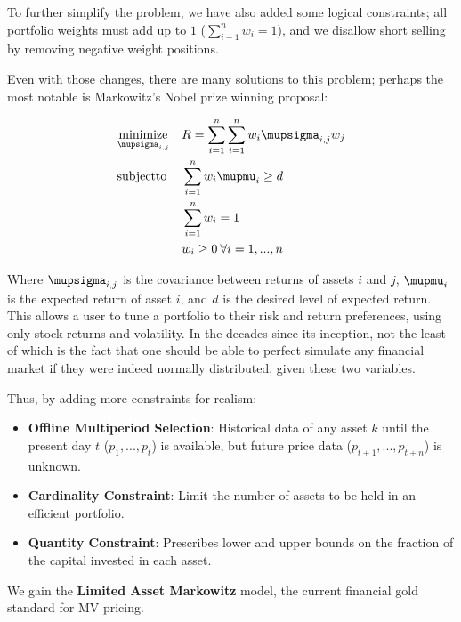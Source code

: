 \documentclass[11pt, a4paper]{awesome-cv}
\begin{document}
\begin{cvletter}
To further simplify the problem, we have also added some logical constraints;
all portfolio weights must add up to \(1\) (\(\sum_{i-1}^{n}w_{i}=1\)), and we
disallow short selling by removing negative weight positions.

Even with those changes, there are many solutions to this problem; perhaps the most notable is Markowitz's Nobel prize winning proposal:

\begin{equation*}
\begin{aligned}
& \underset{\mupsigma_{i,j}}{\mathrm{minimize}}
& & R = \sum_{i=1}^{n} \sum_{i=1}^{n} w_{i} \mupsigma_{i,j} w_{j} \\
& \mathrm{subject to}
& & \sum_{i=1}^{n} w_{i}\mupmu_{i} \geq d \\
&&& \sum_{i=1}^{n} w_{i}  = 1 \\
&&& w_{i} \geq 0 \: \forall i = 1,...,n \\
\end{aligned}
\end{equation*}

Where \(\mupsigma_{i,j}\) is the covariance between returns of assets \(i\) and \(j\),
\(\mupmu_{i}\) is the expected return of asset \(i\), and \(d\) is the desired level of
expected return. This allows a user to tune a portfolio to their risk and return
preferences, using only stock returns and volatility. In the decades since its
inception, not the least of which is the fact that one should be able to perfect
simulate any financial market if they were indeed normally distributed, given
these two variables.

Thus, by  adding more constraints for realism:
\begin{itemize}
\item \textbf{Offline Multiperiod Selection}: Historical data of any asset \(k\) until the
present day \(t\) (\(p_1 , . . . , p_t\)) is available, but future price data
(\(p_{t+1}, . . ., p_{t+n}\)) is unknown.
\item \textbf{Cardinality Constraint}: Limit the number of assets to be held in an efficient portfolio.
\item \textbf{Quantity Constraint}: Prescribes lower and upper bounds on the fraction of the capital invested in each asset.
\end{itemize}

We gain the \textbf{\textbf{Limited Asset Markowitz}} model, the current  financial gold
standard for MV pricing.


\end{cvletter}
\end{document}

